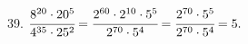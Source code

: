 39. $\cfrac{8^{20}\cdot20^5}{4^{35}\cdot25^2}=\cfrac{2^{60}\cdot2^{10}\cdot5^5}{2^{70}\cdot5^4}=
\cfrac{2^{70}\cdot5^5}{2^{70}\cdot5^4}=5.$\\
